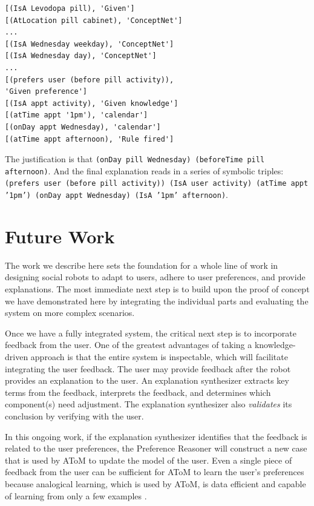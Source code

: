 \documentclass[letterpaper]{article} %
\begin{document}
\small{
\begin{verbatim}
[(IsA Levodopa pill), 'Given']
[(AtLocation pill cabinet), 'ConceptNet']
...
[(IsA Wednesday weekday), 'ConceptNet']
[(IsA Wednesday day), 'ConceptNet']
...
[(prefers user (before pill activity)),
'Given preference']
[(IsA appt activity), 'Given knowledge']
[(atTime appt '1pm'), 'calendar']
[(onDay appt Wednesday), 'calendar']
[(atTime appt afternoon), 'Rule fired']
\end{verbatim}}

The justification is that \texttt{(onDay pill Wednesday) (beforeTime pill
afternoon)}.  And the final explanation reads in a series of symbolic
triples: \texttt{(prefers user (before pill activity)) (IsA user activity) (atTime appt '1pm') (onDay appt Wednesday) (IsA '1pm' afternoon)}.

\vspace{-1.52mm}
\section{Future Work}
The work we describe here sets the foundation for a whole line of work in
designing social robots to adapt to users, adhere to user preferences, and
provide explanations.  The most immediate next step is to build upon the
proof of concept we have demonstrated here by integrating the individual
parts and evaluating the system on more complex scenarios.

Once we have a fully integrated system, the critical next step is to
incorporate feedback from the user.
One of the greatest advantages of taking a knowledge-driven approach is
that the entire system is inspectable, which will facilitate integrating
the user feedback.
The user may provide feedback after the robot provides an explanation to
the user.  An explanation synthesizer extracts key terms from the
feedback, interprets the feedback, and determines which component(s)
need adjustment.  The explanation synthesizer also \emph{validates} its
conclusion by verifying with the user.

In this ongoing work, if the explanation synthesizer identifies that the feedback is related
to the user preferences, the Preference Reasoner will construct a new
case that is used by AToM to update the model of the user.  Even a single
piece of feedback from the user can be sufficient for AToM to learn the
user's preferences because analogical learning, which is used by AToM, is
data efficient and capable of learning from only a few examples
\cite{chen2019human,wilson2019analogical}.
\end{document}
